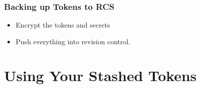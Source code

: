 \documentclass[aspectratio=169]{beamer}
\makeatletter
\def\sectionsubtitle#1{\gdef\@sectionsubtitle{#1}}
\gdef\@sectionsubtitle{}
\makeatother
\begin{document}
{
    \begin{frame}
	   \frametitle{Backing up Tokens to RCS}
	   \begin{itemize}
	       \item Encrypt the tokens and secrets
	       \item Push everything into revision control.
	   \end{itemize}
    \end{frame}
}

{
    \sectionsubtitle{\textcolor{black}{How to Use What You Built}}
    \section{Using Your Stashed Tokens}
}
\end{document}
